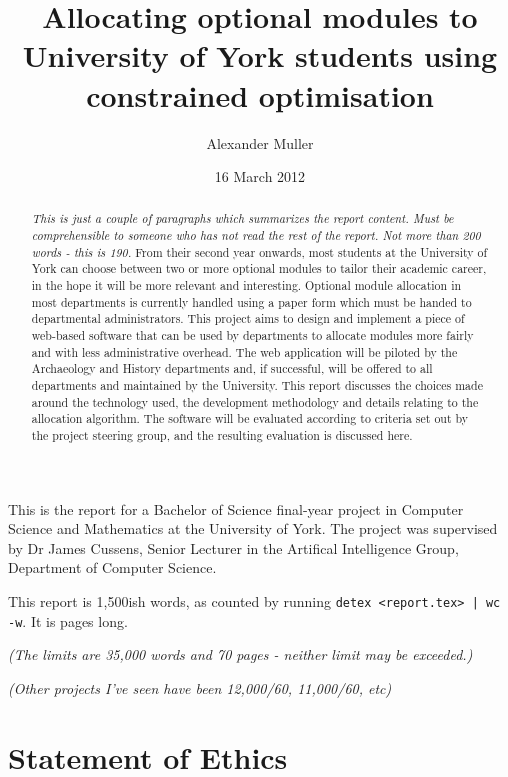 \documentclass[]{article}
\title{Allocating optional modules to University of York students using constrained optimisation}
\author{Alexander Muller}
\date{16 March 2012}
\begin{document}
\ifpdf
{}
\else
{}
\fi

\maketitle

This is the report for a Bachelor of Science final-year project in Computer Science and Mathematics at the University of York. The project was supervised by Dr James Cussens, Senior Lecturer in the Artifical Intelligence Group, Department of Computer Science.

This report is 1,500ish words, as counted by running \verb+detex <report.tex> | wc -w+. It is \pageref{LastPage} pages long.

\textit{(The limits are 35,000 words and 70 pages - neither limit may be exceeded.)}

\textit{(Other projects I've seen have been 12,000/60, 11,000/60, etc)}

\newpage

\begin{abstract}
  \textit{This is \emph{just} a couple of paragraphs which summarizes the report content. Must be comprehensible to someone who has not read the rest of the report.}
  \textit{Not more than 200 words - this is 190.}
  From their second year onwards, most students at the University of York can  choose between two or more optional modules to tailor their academic career, in the hope it will be more relevant and interesting. Optional module allocation in most departments is currently handled using a paper form which must be handed to departmental administrators. This project aims to design and implement a piece of web-based software that can be used by departments to allocate modules more fairly and with less administrative overhead.
  The web application will be piloted by the Archaeology and History departments and, if successful, will be offered to all departments and maintained by the University.
  This report discusses the choices made around the technology used, the development methodology and details relating to the allocation algorithm.
  The software will be evaluated according to criteria set out by the project steering group, and the resulting evaluation is discussed here.
\end{abstract}

\newpage
\tableofcontents
\newpage

\section{Statement of Ethics}
\end{document}
